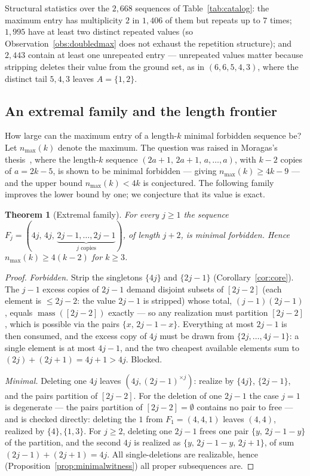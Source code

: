 \documentclass[11pt]{article}
\newtheorem{theorem}{Theorem}[section]
\theoremstyle{definition}
\theoremstyle{remark}
\newcommand{\mass}{\operatorname{mass}}
\newcommand{\intv}[1]{[#1]}
\begin{document}
Structural statistics over the $2{,}668$ sequences of Table~\ref{tab:catalog}: the
maximum entry has multiplicity $2$ in $1{,}406$ of them but repeats up to $7$ times;
$1{,}995$ have at least two distinct repeated values (so
Observation~\ref{obs:doubledmax} does not exhaust the repetition structure); and
$2{,}443$ contain at least one unrepeated entry --- unrepeated values matter because
stripping deletes their value from the ground set, as in $(6,6,5,4,3)$, where the
distinct tail $5,4,3$ leaves $A=\{1,2\}$.

\subsection{An extremal family and the length frontier}

How large can the maximum entry of a length-$k$ minimal forbidden sequence be? Let
$n_{\max}(k)$ denote the maximum. The question was raised in Moragas's
thesis~\cite[\S4.2.1]{Moragas10}, where the length-$k$ sequence
$(2a{+}1,\,2a{+}1,\,a,\dots,a)$, with $k-2$ copies of $a=2k-5$, is shown to be
minimal forbidden --- giving $n_{\max}(k)\ge4k-9$ --- and the upper bound
$n_{\max}(k)<4k$ is conjectured. The following family improves the lower bound by
one; we conjecture that its value is exact.

\begin{theorem}[Extremal family]\label{thm:extremal}
For every $j\ge1$ the sequence
$F_j=(4j,\,4j,\,\underbrace{2j-1,\dots,2j-1}_{j\text{ copies}})$, of length $j+2$,
is minimal forbidden. Hence $n_{\max}(k)\ge4(k-2)$ for $k\ge3$.
\end{theorem}

\begin{proof}
\emph{Forbidden.} Strip the singletons $\{4j\}$ and $\{2j-1\}$
(Corollary~\ref{cor:core}). The $j-1$ excess copies of $2j-1$ demand disjoint
subsets of $\intv{2j-2}$ (each element is $\le 2j-2$: the value $2j-1$ is stripped)
whose total, $(j-1)(2j-1)$, equals $\mass(\intv{2j-2})$ exactly --- so any
realization must partition $\intv{2j-2}$, which is possible via the pairs
$\{x,\,2j-1-x\}$. Everything at most $2j-1$ is then consumed, and the excess copy of
$4j$ must be drawn from $\{2j,\dots,4j-1\}$: a single element is at most $4j-1$, and
the two cheapest available elements sum to $(2j)+(2j+1)=4j+1>4j$. Blocked.

\emph{Minimal.} Deleting one $4j$ leaves $(4j,(2j-1)^{\times j})$: realize by
$\{4j\}$, $\{2j-1\}$, and the pairs partition of $\intv{2j-2}$. For the deletion of
one $2j-1$ the case $j=1$ is degenerate --- the pairs partition of
$\intv{2j-2}=\emptyset$ contains no pair to free --- and is checked directly:
deleting the $1$ from $F_1=(4,4,1)$ leaves $(4,4)$, realized by $\{4\},\{1,3\}$.
For $j\ge2$, deleting one $2j-1$ frees one pair $\{y,\,2j-1-y\}$ of the partition,
and the second $4j$ is realized as $\{y,\,2j-1-y,\,2j+1\}$, of sum
$(2j-1)+(2j+1)=4j$. All single-deletions are realizable, hence
(Proposition~\ref{prop:minimalwitness}) all proper subsequences are.
\end{proof}
\end{document}
